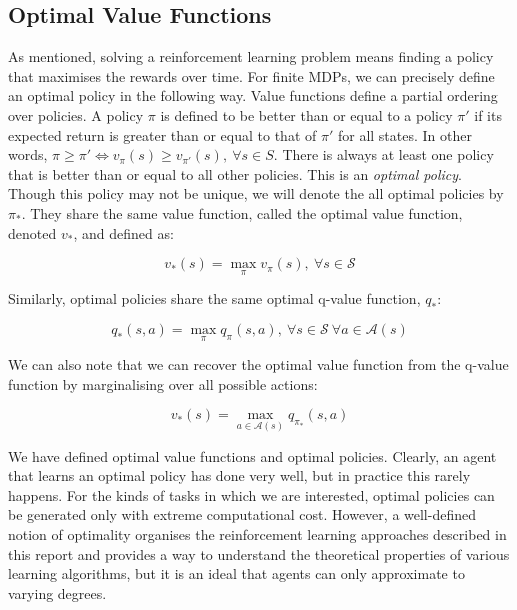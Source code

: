 \documentclass{article}
\begin{document}
\subsection{Optimal Value Functions}

As mentioned, solving a reinforcement learning problem means finding a policy that maximises the rewards over time. For finite MDPs, we can precisely define an optimal policy in the following way. Value functions define a partial ordering over policies. A policy $\pi$ is defined to be better than or equal to a policy $\pi'$ if its expected return is greater than or equal to that of $\pi'$ for all states. In other words, $ \pi \geq \pi' \iff v_\pi(s) \geq v_{\pi'}(s), \ \forall s \in S$. There is always at least one policy that is better than or equal to all other policies. \citep{sutton2018reinforcement} This is an \textit{optimal policy}. Though this policy may not be unique, we will denote the all optimal policies by $\pi_*$. They share the same value function, called the optimal value function, denoted $v_*$, and defined as:

\begin{equation}
	v_*(s) = \max_{\pi} v_\pi(s), \ \forall s \in \mathcal{S}
\end{equation}

Similarly, optimal policies share the same optimal q-value function, $q_*$:

\begin{equation}
	q_*(s, a) = \max_{\pi} q_\pi(s, a), \ \forall s \in \mathcal{S} \ \forall a \in \mathcal{A}(s)
\end{equation}

 We can also note that we can recover the optimal value function from the q-value function by marginalising over all possible actions:

\begin{equation}
	v_*(s) = \max_{a \in \mathcal{A}(s)} q_{\pi_*}(s, a)
\end{equation}


We have defined optimal value functions and optimal policies. Clearly, an agent that learns an optimal policy has done very well, but in practice this rarely happens. For the kinds of tasks in which we are interested, optimal policies can be generated only with extreme computational cost. However, a well-defined notion of optimality organises the reinforcement learning approaches described in this report and provides a way to understand the theoretical properties of various learning algorithms, but it is an ideal that agents can only approximate to varying degrees.
\end{document}
